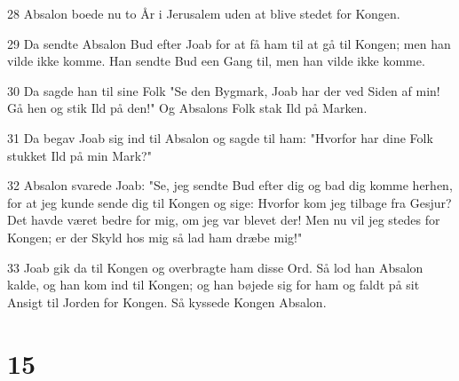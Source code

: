 \par 28 Absalon boede nu to År i Jerusalem uden at blive stedet for Kongen.
\par 29 Da sendte Absalon Bud efter Joab for at få ham til at gå til Kongen; men han vilde ikke komme. Han sendte Bud een Gang til, men han vilde ikke komme.
\par 30 Da sagde han til sine Folk "Se den Bygmark, Joab har der ved Siden af min! Gå hen og stik Ild på den!" Og Absalons Folk stak Ild på Marken.
\par 31 Da begav Joab sig ind til Absalon og sagde til ham: "Hvorfor har dine Folk stukket Ild på min Mark?"
\par 32 Absalon svarede Joab: "Se, jeg sendte Bud efter dig og bad dig komme herhen, for at jeg kunde sende dig til Kongen og sige: Hvorfor kom jeg tilbage fra Gesjur? Det havde været bedre for mig, om jeg var blevet der! Men nu vil jeg stedes for Kongen; er der Skyld hos mig så lad ham dræbe mig!"
\par 33 Joab gik da til Kongen og overbragte ham disse Ord. Så lod han Absalon kalde, og han kom ind til Kongen; og han bøjede sig for ham og faldt på sit Ansigt til Jorden for Kongen. Så kyssede Kongen Absalon.

\chapter{15}

